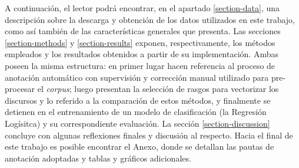 A continuaci\'on, el lector podr\'a encontrar, en el apartado \ref{section-data},
una descripci\'on sobre la descarga y obtenci\'on de los datos utilizados en este
trabajo, como as\'i tambi\'en de las caracter\'isticas generales que presenta. Las
secciones \ref{section-methods} y \ref{section-results} exponen, respectivamente,
los m\'etodos empleados y los resultados obtenidos a partir de su implementaci\'on.
Ambas poseen la misma estructura: en primer lugar hacen referencia
al proceso de anotaci\'on autom\'atico con supervisi\'on y correcci\'on manual utilizado
para pre-procesar el \textit{corpus}; luego presentan la selecci\'on de rasgos
para vectorizar los discursos y lo referido a la comparaci\'on de estos m\'etodos, y
finalmente se detienen en el entrenamiento de un modelo de clasificaci\'on (la
Regresi\'on Log\'isitca) y su correspondiente evaluaci\'on. La secci\'on
\ref{section-discussion} concluye con algunas reflexiones finales y
discusi\'on al respecto. Hacia el final de este trabajo es posible encontrar el
Anexo, donde se detallan las pautas de anotaci\'on adoptadas y tablas y gr\'aficos
adicionales.
